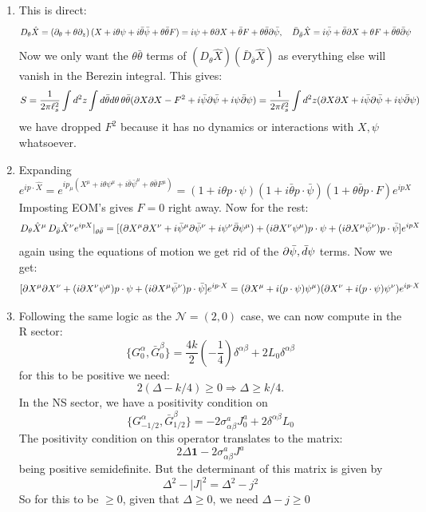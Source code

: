 \documentclass[11pt]{article}
\begin{document}
\begin{enumerate}
	\item This is direct:
	\[
	\begin{aligned}
		D_\theta \hat X &= \left(\partial_\theta + \theta \partial_z \right) (X + i \theta \psi + i \bar \theta \bar \psi + \theta \bar \theta F) = i \psi + \theta \partial X + \bar \theta F + \theta \bar \theta \partial \bar \psi, \quad \bar D_{\bar \theta} \hat X = i \bar \psi + \bar \theta \partial X + \theta F + \bar \theta \theta \bar {\partial} \psi
	\end{aligned}
	\]
	Now we only want the $\theta \bar \theta$ terms of $(D_\theta \hat X)(\bar D_{\bar \theta} \hat X)$ as everything else will vanish in the Berezin integral. This gives:
	\[
		S= \frac{1}{2\pi \ell_s^2} \int d^2 z \int d\bar \theta d \theta \, \theta \bar \theta (\partial X \partial X - F^2 + i \bar \psi \partial \bar \psi + i \psi \bar {\partial} \psi) = \frac{1}{2\pi \ell_s^2} \int d^2 z (\partial X \partial X + i \bar \psi \partial \bar \psi + i \psi \bar {\partial} \psi)
	\]
	we have dropped $F^2$ because it has no dynamics or interactions with $X, \psi$ whatsoever. 
	
	\item Expanding 
	\[
		e^{i p \cdot \hat X} = e^{i p_\mu (X^\mu + i \theta \psi^\mu + i \bar \theta \bar \psi^\mu + \theta \bar \theta F^\mu)} = (1 + i \theta p \cdot \psi) (1+ i \bar \theta p \cdot \bar \psi) (1+ \theta \bar \theta p \cdot F) e^{i p X} 
	\]
	Imposting EOM's gives $F = 0$ right away. Now for the rest:
	\[
		D_\theta \hat X^\mu \, D_{\bar \theta} \hat X^\nu e^{i p X}|_{\theta \bar \theta}= [(\partial X^\mu \partial X^\nu + i \bar \psi^\mu \partial \bar \psi^\nu + i \psi^\nu \bar {\partial} \psi^\mu) + (i \partial X^\nu \psi^\mu)  p \cdot \psi + (i \partial X^\mu \bar \psi^\nu) p \cdot \bar \psi] e^{i p X}
	\]
	again using the equations of motion we get rid of the $\partial \bar \psi, \bar d \psi$ terms. Now we get:
	\[
		[\partial X^\mu \partial X^\nu + (i \partial X^\nu \psi^\mu)  p \cdot \psi + (i \partial X^\mu \bar \psi^\nu) p \cdot \bar \psi] e^{i p \cdot X} = (\partial X^\mu + i (p \cdot \psi) \psi^\mu) (\partial X^\nu + i (p \cdot \psi) \psi^\nu) e^{i p \cdot X}
	\]
	\item Following the same logic as the $\mathcal{N} = (2,0)$ case, we can now compute in the R sector:
	\[
		\{G_0^\alpha, \bar G_0^\beta\} = \frac{4 k}{2} \left(- \frac14 \right) \delta^{\alpha \beta} + 2 L_0 \delta^{\alpha \beta}
	\]
	for this to be positive we need:
	\[
		2 (\Delta - k/4) \geq 0 \Rightarrow \Delta \geq k/4.
	\]
	In the NS sector, we have a positivity condition on
	\[
		\{G_{-1/2}^\alpha, \bar G_{1/2}^\beta\} = -2 \sigma^a_{\alpha \beta} J^a_0 + 2 \delta^{\alpha \beta} L_0
	\]
	The positivity condition on this operator translates to the matrix:
	\[
		2 \Delta \mathbf{1} - 2 \sigma^a_{\alpha \beta} J^a
	\]
	being positive semidefinite. But the determinant of this matrix is given by
	\[
		\Delta^2 - |J|^2 = \Delta^2 - j^2
	\]
	So for this to be $\geq 0$, given that $\Delta \geq 0$, we need $\Delta - j \geq 0$
	

\end{enumerate}
\end{document}
